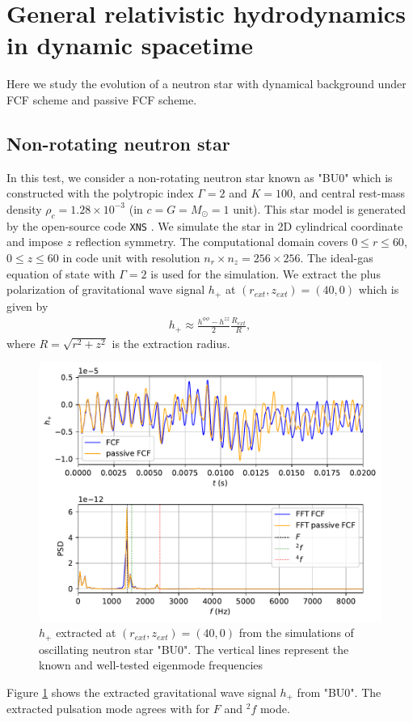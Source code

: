\section{General relativistic hydrodynamics in dynamic spacetime} %
\label{section4.3}
Here we study the evolution of a neutron star with dynamical background under FCF scheme and passive FCF scheme.
\subsection{Non-rotating neutron star}
\label{section4.3.1}
In this test, we consider a non-rotating neutron star known as "BU0" \cite{dimmelmeier2006non}
which is constructed with the polytropic index $\Gamma = 2$ and $K = 100$,
and central rest-mass density $\rho_c = 1.28 \times 10^{-3}$ (in $c=G=M_\odot=1$ unit).
This star model is generated by the open-source code \texttt{XNS} 
\cite{bucciantini2011general,pili2014axisymmetric,pili2015general,pili2017general}.
We simulate the star in 2D cylindrical coordinate and impose $z$ reflection symmetry.
The computational domain covers $0 \leq r \leq 60$, $0\leq z \leq 60$ in code unit
with resolution $n_r \times n_z = 256 \times 256$.
The ideal-gas equation of state with $\Gamma = 2$ is used for the simulation.
We extract the plus polarization of gravitational wave signal $h_{+}$ at $(r_{ext}, z_{ext}) = (40, 0)$ which is given by
\begin{align}
    h_{+} \approx \frac{h^{\phi\phi} - h^{zz}}{2} \frac{R_{ext}}{R},
\end{align}
where $R=\sqrt{r^2+z^2}$ is the extraction radius.

\begin{figure}[h!]
\centering
  \includegraphics[width=\linewidth]{GW_combine_h_BU0.pdf}
\caption{$h_{+}$ extracted at $(r_{ext}, z_{ext}) = (40, 0)$ from the simulations of oscillating neutron star "BU0".
The vertical lines represent the known and well-tested eigenmode frequencies \cite{dimmelmeier2006non}}
\label{fig:GW_h_BU0}
\end{figure}
Figure \ref{fig:GW_h_BU0} shows the extracted gravitational wave signal $h_{+}$ from "BU0".
The extracted pulsation mode agrees with \cite{dimmelmeier2006non} for $F$ and ${}^2f$ mode.

